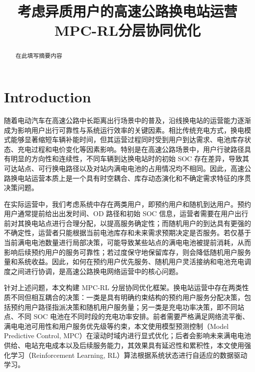 \documentclass[12pt,hyperref,a4paper,UTF8]{ctexart}
\begin{document}
\cover

\newpage
\begin{abstract}

在此填写摘要内容

\end{abstract}
\newpage

\thispagestyle{empty} %

\newpage
\tableofcontents

\newpage

\begin{center}
   \title{ \Huge \textbf{{考虑异质用户的高速公路换电站运营MPC-RL分层协同优化}}}
\end{center}


\section{Introduction}
随着电动汽车在高速公路中长距离出行场景中的普及，沿线换电站的运营能力逐渐成为影响用户出行可靠性与系统运行效率的关键因素。相比传统充电方式，换电模式能够显著缩短车辆补能时间，但其运营过程同时受到用户到达需求、电池库存状态、充电过程和电价变化等因素影响。特别是在高速公路场景中，用户行驶路径具有明显的方向性和连续性，不同车辆到达换电站时的初始 SOC 存在差异，导致其可达站点、可行换电路径以及对站内满电电池的占用情况均不相同。因此，高速公路换电站运营本质上是一个具有时空耦合、库存动态演化和不确定需求特征的序贯决策问题。

在实际运营中，我们考虑系统中存在两类用户，即预约用户和随机到达用户。预约用户通常提前给出出发时间、OD 路径和初始 SOC 信息，运营者需要在用户出行前对其换电站点进行合理分配，以提高服务确定性；而随机用户的到达具有更强的不确定性，运营者只能根据当前电池库存和未来需求预期决定是否服务。若仅基于当前满电电池数量进行局部决策，可能导致某些站点的满电电池被提前消耗，从而影响后续预约用户的服务可靠性；若过度保守地保留库存，则会降低随机用户服务量和系统收益。因此，如何在预约用户优先服务、随机用户灵活接纳和电池充电调度之间进行协调，是高速公路换电网络运营中的核心问题。

针对上述问题，本文构建 MPC-RL 分层协同优化框架。换电站运营中存在两类性质不同但相互耦合的决策：一类是具有明确约束结构的预约用户服务分配决策，包括预约用户路径指派决策和随机用户服务量；另一类是充电功率决策，即不同站点、不同 SOC 电池在不同时段的充电功率安排。前者需要严格满足网络流平衡、满电电池可用性和用户服务优先级等约束，本文使用模型预测控制（Model Predictive Control, MPC）在滚动时域内进行显式优化；后者会影响未来满电电池供给、电站充电成本以及后续服务能力，其效果具有延迟性和累积性，本文使用强化学习（Reinforcement Learning, RL）算法根据系统状态进行自适应的数据驱动学习。
\end{document}
